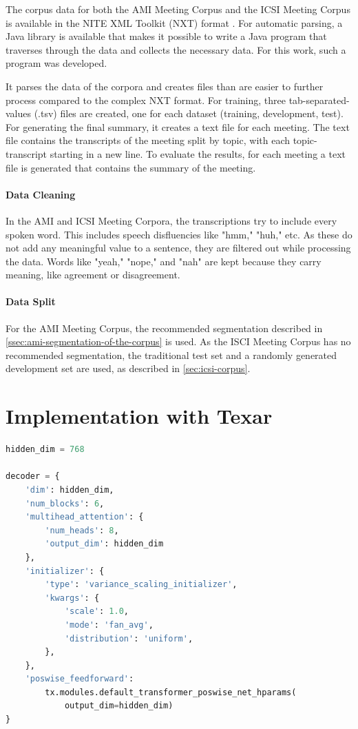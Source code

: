 The corpus data for both the AMI Meeting Corpus and the ICSI Meeting Corpus is available in the NITE XML Toolkit (NXT) format \cite{Carletta2003}.
For automatic parsing, a Java library is available that makes it possible to write a Java program that traverses through the data and collects the necessary data.
For this work, such a program was developed.

It parses the data of the corpora and creates files than are easier to further process compared to the complex NXT format.
For training, three tab-separated-values (.tsv) files are created, one for each dataset (training, development, test).
For generating the final summary, it creates a text file for each meeting.
The text file contains the transcripts of the meeting split by topic, with each topic-transcript starting in a new line.
To evaluate the results, for each meeting a text file is generated that contains the summary of the meeting.

\paragraph{Data Cleaning}

In the AMI and ICSI Meeting Corpora, the transcriptions try to include every spoken word.
This includes speech disfluencies like "hmm," "huh," etc.
As these do not add any meaningful value to a sentence, they are filtered out while processing the data.
Words like "yeah," "nope," and "nah" are kept because they carry meaning, like agreement or disagreement. 

\paragraph{Data Split}

For the AMI Meeting Corpus, the recommended segmentation described in \cref{ssec:ami-segmentation-of-the-corpus} is used.
As the ISCI Meeting Corpus has no recommended segmentation, the traditional test set and a randomly generated development set are used, as described in \cref{sec:icsi-corpus}.


\section{Implementation with Texar}

\begin{lstlisting}[numbers=none,language=Python,caption={Hyperparameters for Transformer decoder},captionpos=b,label=lst:hyperparameters-decoder]
hidden_dim = 768

decoder = {
    'dim': hidden_dim,
    'num_blocks': 6,
    'multihead_attention': {
        'num_heads': 8,
        'output_dim': hidden_dim
    },
    'initializer': {
        'type': 'variance_scaling_initializer',
        'kwargs': {
            'scale': 1.0,
            'mode': 'fan_avg',
            'distribution': 'uniform',
        },
    },
    'poswise_feedforward': 
        tx.modules.default_transformer_poswise_net_hparams(
            output_dim=hidden_dim)
}
\end{lstlisting}


